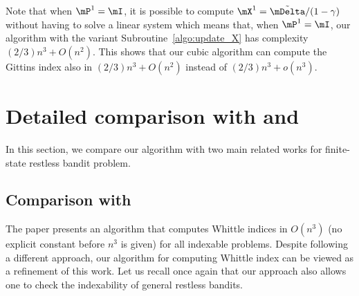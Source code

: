 Note that when $\mP^1=\mI$, it is possible to compute $\mX^1=\tilde{\mDelta}/(1-\gamma)$ without having to solve a linear system which means that, when $\mP^1=\mI$, our algorithm with the variant Subroutine~\ref{algo:update_X} has complexity $(2/3) n^3 +O(n^2)$.
This shows that our cubic algorithm can compute the Gittins index also in $(2/3) n^3 +O(n^2)$ instead of $(2/3)n^3 +o(n^3)$.

\section{Detailed comparison with \texorpdfstring{\cite{akbarzadeh2020conditions} and \cite{nino2020fast}}{Akbarzadeh et al. 2020 and Nino Mora 2020.}}
\label{ch:cpt:apx:comparison}

In this section, we compare our algorithm with two main related works for finite-state restless bandit problem.

\subsection{Comparison with \texorpdfstring{\cite{akbarzadeh2020conditions}}{Akbarzadeh2020 et al. 2022}}
The paper presents an  algorithm that computes Whittle indices  in $O(n^3)$ (no explicit constant before $n^3$ is given) for all indexable problems. Despite following a different approach, our algorithm for computing Whittle index can be viewed as a refinement of this work. Let us recall once again that our approach also allows one to check the indexability of general restless bandits.

